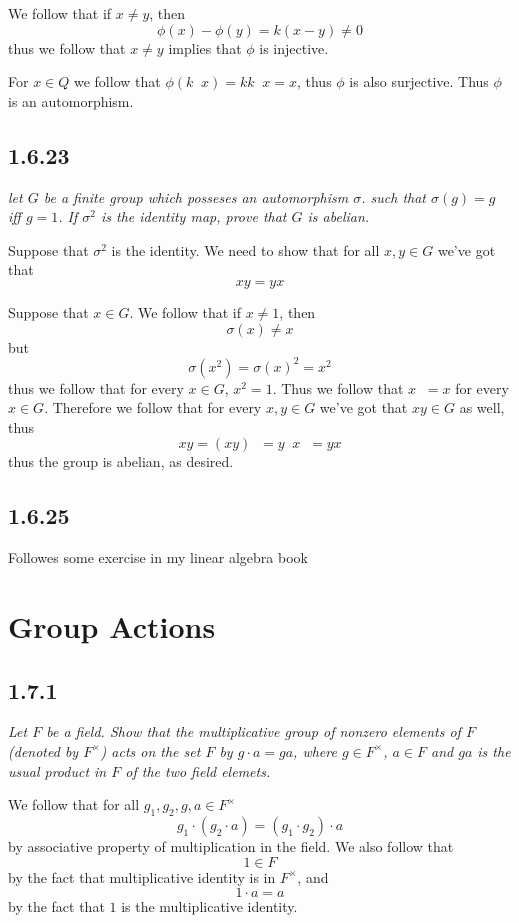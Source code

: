 \documentclass[11pt,oneside,titlepage]{book}
\DeclareMathOperator \inv {^{-1}}
\begin{document}
We follow that if $x \neq y$, then
$$\phi(x) - \phi(y) = k(x - y) \neq 0$$
thus we follow that $x \neq y$ implies that $\phi$ is injective.

For $x \in Q$ we follow that $\phi(k\inv x) = k k\inv x = x$, thus $\phi$ is
also surjective. Thus $\phi$ is an automorphism.

\subsection*{1.6.23}

\textit{let $G$ be a finite group which posseses an automorphism $\sigma$.
  such that $\sigma(g) = g$ iff $g = 1$. If $\sigma^2$ is the identity map, prove that
  $G$ is abelian.}

Suppose that $\sigma^2$ is the identity. We need to show that for all $x, y \in G$
we've got that
$$xy = yx$$

Suppose that $x \in G$. We follow that if $x \neq 1$, then
$$\sigma(x) \neq x$$
but
$$\sigma(x^2) = \sigma(x)^2 = x^2$$
thus we follow that for every $x \in G$, $x^2 = 1$. Thus we follow that $x\inv = x$ for
every $x \in G$. Therefore we follow that for every $x, y \in G$ we've got that
$xy \in G$ as well, thus
$$xy = (xy)\inv = y\inv x\inv = yx$$
thus the group is abelian, as desired.

\subsection*{1.6.25}

Followes some exercise in my linear algebra book

\section{Group Actions}

\subsection*{1.7.1}

\textit{Let $F$ be a field. Show that the multiplicative group of nonzero elements of $F$
  (denoted by $F^\times$)
  acts on the set $F$ by $g \cdot a = ga$, where $g \in F^\times$, $a \in F$ and $ga$ is
  the usual product in $F$ of the two field elemets.}

We follow that for all $g_1, g_2, g, a \in F^\times$
$$g_1 \cdot (g_2 \cdot a) = (g_1 \cdot g_2) \cdot a$$
by associative property of multiplication in the field.
We also follow that
$$1 \in F$$
by the fact that multiplicative identity is in $F^\times$, and
$$1 \cdot a = a$$
by the fact that $1$ is the multiplicative identity.
\end{document}
